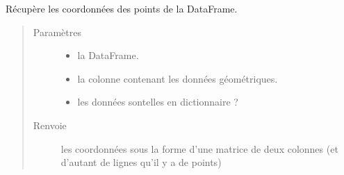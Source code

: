 \documentclass[letterpaper,10pt,french]{sphinxmanual}
\begin{document}
\begin{fulllineitems}
\label{\detokenize{index:src.clusterizer.utils.clusterizer_utils.get_coords_from_object}}
\sphinxAtStartPar
Récupère les coordonnées des points de la DataFrame.
\begin{quote}\begin{description}
\item[{Paramètres}] \leavevmode\begin{itemize}
\item {} 
\sphinxAtStartPar
{} \textendash{} la DataFrame.

\item {} 
\sphinxAtStartPar
{} \textendash{} la colonne contenant les données géométriques.

\item {} 
\sphinxAtStartPar
{} \textendash{} les données sont\sphinxhyphen{}elles en dictionnaire ?

\end{itemize}

\item[{Renvoie}] \leavevmode
\sphinxAtStartPar
les coordonnées sous la forme d’une matrice de deux colonnes (et d’autant de lignes qu’il y a de points)

\end{description}\end{quote}

\end{fulllineitems}

\end{document}
